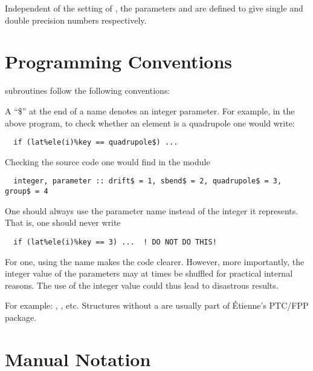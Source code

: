 Independent of the setting of , the parameters  and
 are defined to give single and double precision numbers
respectively.

\section{Programming Conventions}

\bmad subroutines follow the following conventions:

\begin{description}

\item[A ``\$'' suffix denotes a parameter:] 
A ``\$'' at the end of a name denotes an 
integer parameter. For example, in the above program, to check
whether an element is a quadrupole one would write:
\begin{verbatim}
  if (lat%ele(i)%key == quadrupole$) ...
\end{verbatim}
Checking the source code one would find in the module 
\begin{verbatim}
  integer, parameter :: drift$ = 1, sbend$ = 2, quadrupole$ = 3, group$ = 4
\end{verbatim}
One should always use the parameter name instead of the integer it represents.
That is, one should never write
\begin{verbatim}
  if (lat%ele(i)%key == 3) ...  ! DO NOT DO THIS!
\end{verbatim}
For one, using the name makes the code clearer. However, more
importantly, the integer value of the parameters may at times be
shuffled for practical internal reasons. The use of the integer value
could thus lead to disastrous results.  

\item[Structure names have a ``_struct'' suffix:]
For example: , , etc. Structures without a 
 are usually part of \'Etienne's PTC/FPP package.

\end{description}

\section{Manual Notation}
\label{s:component}

